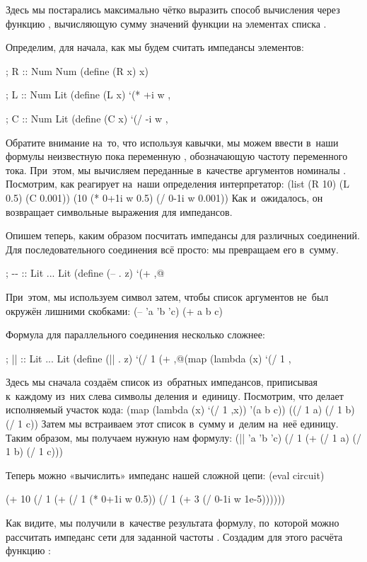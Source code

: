 Здесь мы постарались максимально чётко выразить способ вычисления через функцию , вычисляющую сумму значений функции  на элементах списка .

Определим, для начала, как мы будем считать импедансы элементов:

\begin{Definition}[emph={x}]
; R :: Num \arrow Num
(define (R x) x)

; L :: Num \arrow Lit
(define (L x) `(* +i w ,%

; C :: Num \arrow Lit
(define (C x) `(/ -i w ,%
\end{Definition}

Обратите внимание на~то, что используя кавычки, мы можем ввести в~наши формулы неизвестную пока переменную , обозначающую частоту переменного тока. При~этом, мы вычисляем переданные в~качестве аргументов номиналы . Посмотрим, как реагирует на~наши определения интерпретатор:
\REPL
  {(list (R 10) (L 0.5) (C 0.001))}
  {(10 (* 0+1i w 0.5) (/ 0-1i w 0.001))}
\noindent Как и~ожидалось, он возвращает символьные выражения для импедансов.

Опишем теперь, каким образом посчитать импедансы для различных соединений. Для последовательного соединения всё просто: мы превращаем его в~сумму.
\begin{Definition}[emph=z]
; -{-} :: Lit ... \arrow Lit
(define (-- . z) `(+ ,@%
\end{Definition}
\noindent При~этом, мы используем символ  затем, чтобы список аргументов не~был окружён лишними скобками:
\REPL
  {(-- 'a 'b 'c)}
  {(+ a b c)}

Формула для параллельного соединения несколько сложнее:
\begin{Definition}[emph={x,z}]
; || :: Lit ... \arrow Lit
(define (|| . z)
  `(/ 1 (+ ,@(map (lambda (x) `(/ 1 ,%
\end{Definition}

Здесь мы сначала создаём список из~обратных импедансов, приписывая к~каждому из~них слева символы деления и~единицу. Посмотрим, что делает исполняемый участок кода:
\REPL
  {(map (lambda (x) `(/ 1 ,x)) '(a b c))}
  {((/ 1 a) (/ 1 b) (/ 1 c))}
\noindent Затем мы встраиваем этот список в~сумму и~делим на~неё единицу. Таким образом, мы получаем нужную нам формулу:
\REPL
  {(|| 'a 'b 'c)}
  {(/ 1 (+ (/ 1 a) (/ 1 b) (/ 1 c)))}

Теперь можно «вычислить» импеданс нашей сложной цепи:
\REPLin
  {(eval circuit)}
\begin{mREPLout}
   (+ 10 (/ 1 (+ (/ 1 (* 0+1i w 0.5))
         (/ 1 (+ 3 (/ 0-1i w 1e-5))))))
\end{mREPLout}
\noindent Как видите, мы получили в~качестве результата формулу, по~которой можно рассчитать импеданс сети для заданной частоты . Создадим для этого расчёта функцию :

